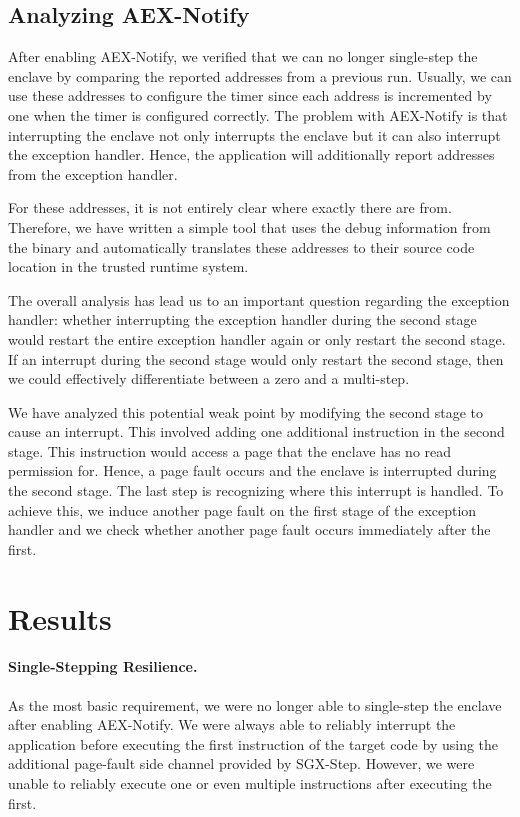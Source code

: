 \documentclass{llncs}
\begin{document}
\subsection{Analyzing AEX-Notify}

After enabling AEX-Notify, we verified that we can no longer single-step the enclave
by comparing the reported addresses from a previous run.
Usually, we can use these addresses to configure the timer
since each address is incremented by one when the timer is configured correctly.
The problem with AEX-Notify is that interrupting the enclave not only
interrupts the enclave but it can also interrupt the exception handler.
Hence, the application will additionally report addresses from the exception handler.

For these addresses, it is not entirely clear where exactly there are from.
Therefore, we have written a simple tool that uses the debug information from the binary and
automatically translates these addresses to their source code location in the trusted runtime system.


The overall analysis has lead us to an important question regarding the exception handler:
whether interrupting the exception handler during the second stage would
restart the entire exception handler again or only restart the second stage.
If an interrupt during the second stage would only restart the second stage,
then we could effectively differentiate between a zero and a multi-step.

We have analyzed this potential weak point by modifying the second stage to cause an interrupt.
This involved adding one additional instruction in the second stage.
This instruction would access a page that the enclave has no read permission for.
Hence, a page fault occurs and the enclave is interrupted during the second stage.
The last step is recognizing where this interrupt is handled.
To achieve this, we induce another page fault on the first stage of the exception handler
and we check whether another page fault occurs immediately after the first.

\section{Results}

\paragraph{Single-Stepping Resilience.}
As the most basic requirement,
we were no longer able to single-step the enclave after enabling AEX-Notify.
We were always able to reliably interrupt the application
before executing the first instruction of the target code
by using the additional page-fault side channel provided by SGX-Step.
However, we were unable to reliably execute one or
even multiple instructions after executing the first.
\end{document}

